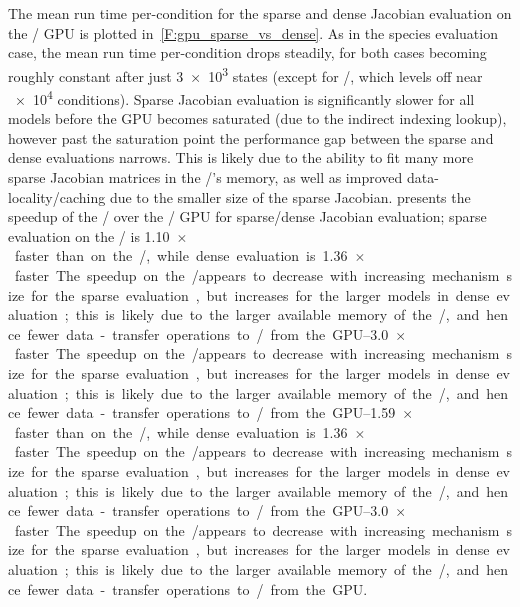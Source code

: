 \documentclass[12pt,number,sort&compress,preprint]{elsarticle}
\begin{document}
The mean run time per-condition for the sparse and dense Jacobian evaluation on the \gpunew/ GPU is plotted in~\cref{F:gpu_sparse_vs_dense}.
As in the species evaluation case, the mean run time per-condition drops steadily, for both cases becoming roughly constant after just \num{3e3} states (except for \slash{}, which levels off near \num{e4} conditions).
Sparse Jacobian evaluation is significantly slower for all models before the GPU becomes saturated (due to the indirect indexing lookup), however past the saturation point the performance gap between the sparse and dense evaluations narrows.
This is likely due to the ability to fit many more sparse Jacobian matrices in the \gpunew/'s memory, as well as improved data-locality\slash caching due to the smaller size of the sparse Jacobian.
 presents the speedup of the \gpunew/ over the \gpuold/ GPU for sparse\slash dense Jacobian evaluation; sparse evaluation on the \gpunew/ is \SIrange{1.10}{1.59}{$\times$} faster than on the \gpuold/, while dense evaluation is \SIrange{1.36}{3.0}{$\times$} faster.
The speedup on the \gpunew/ appears to decrease with increasing mechanism size for the sparse evaluation, but increases for the larger models in dense evaluation; this is likely due to the larger available memory of the \gpunew/, and hence fewer data-transfer operations to\slash from the GPU.
\end{document}
